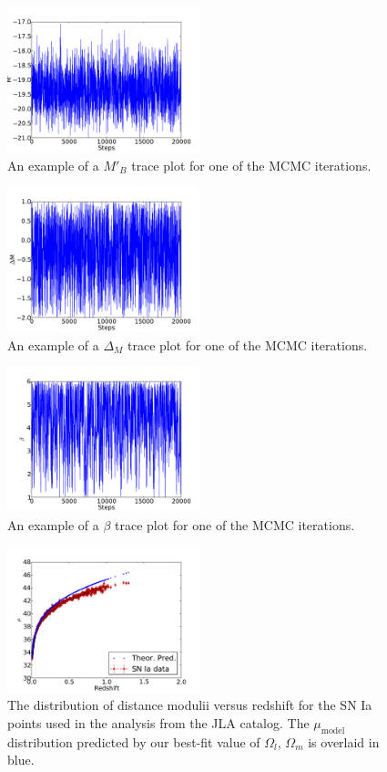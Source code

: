 \documentclass[aps,prl,reprint]{revtex4-1}
\begin{document}
\begin{figure}
 \includegraphics[width=0.5\textwidth]{../plots/Mp.pdf}
\caption{\label{fig:mp}An example of a  $M'_B$ trace plot for one of the MCMC iterations.}
\end{figure}
\begin{figure}
 \includegraphics[width=0.5\textwidth]{../plots/dM.pdf}
\caption{\label{fig:dm}An example of a  $\Delta_M$ trace plot for one of the MCMC iterations.}
\end{figure}
\begin{figure}
 \includegraphics[width=0.5\textwidth]{../plots/beta.pdf}
\caption{\label{fig:beta}An example of a  $\beta$ trace plot for one of the MCMC iterations.}
\end{figure}
\begin{figure}
 \includegraphics[width=0.5\textwidth]{../plots/mu.pdf}
\caption{\label{fig:mu}The distribution of distance modulii versus redshift for the SN Ia points used in the analysis from the JLA catalog. The $\mu_\text{model}$ distribution predicted by our best-fit value of $\Omega_l$, $\Omega_m$ is overlaid in blue.}
\end{figure}
\end{document}
